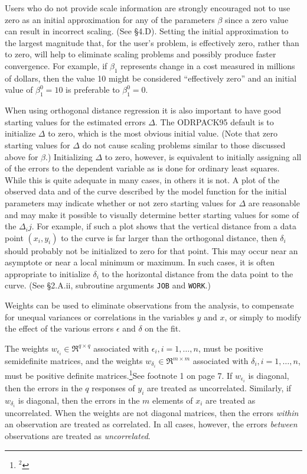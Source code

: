 \noindent Users who do not provide scale information are strongly encouraged not to use zero as an initial approximation for any of the parameters $\beta$ since a zero value can result in incorrect scaling. (See \S 4.D). Setting the initial approximation to the largest magnitude that, for the user's problem, is effectively zero, rather than to zero, will help to eliminate scaling problems and possibly produce faster convergence. For example, if $\beta_1$ represents change in a cost measured in millions of dollars, then the value 10 might be considered ``effectively zero'' and an initial value of $\beta_{1}^{0}=10$ is preferable to
$\beta_{1}^{0}=0$.

\noindent When using orthogonal distance regression it is also important to have
good starting values for the estimated errors $\Delta$. The ODRPACK95 default is to initialize $\Delta$ to zero, which is the most obvious initial value. (Note that zero starting values for $\Delta$ do not cause scaling problems similar to those discussed above for $\beta$.) Initializing $\Delta$ to zero, however, is equivalent to initially assigning all of the errors to the dependent variable as is done for ordinary least squares. While this is quite adequate in many cases, in others it is not. A plot of the observed data and of the curve described by the model function for the initial parameters may indicate whether or not zero starting values for $\Delta$ are reasonable and may make it possible to visually determine better starting values for some of the $\Delta_ij$. For example, if such a plot shows that the vertical distance from a data point $(x_{i},y_{i})$ to the curve is far larger than the orthogonal distance, then $\delta_i$ should probably not be initialized to zero for that point. This may occur near an asymptote or near a local minimum or maximum. In such cases, it is often appropriate to initialize $\delta_i$ to the horizontal distance from the data point to the curve. (See \S 2.A.ii, subroutine arguments {\tt JOB} and {\tt WORK}.)

\bigskip{}
\medskip
\noindent Weights can be used to eliminate observations from the analysis, to compensate for unequal variances or correlations in the variables $y$ and $x$, or simply to modify the effect of the various errors $\epsilon$ and $\delta$ on the fit.

\noindent The weights $w_{\epsilon_{i}}\in\Re^{q\times q}$ associated
with $\epsilon_{i},i=1,\ldots,n$, must be positive semidefinite
matrices, and the weights $w_{\delta_{i}}\in\Re^{m\times m}$
associated with $\delta_{i},i=1,\ldots,n$, must be positive definite
matrices.\footnote{$^2$}{\rmVIII See footnote 1 on page 7.} If
$w_{\epsilon_{i}}$ is diagonal, then the errors in the $q$ responses
of $y_i$ are treated as uncorrelated. Similarly, if $w_{\delta_{i}}$
is diagonal, then the errors in the $m$ elements of $x_i$ are treated
as uncorrelated. When the weights are not diagonal matrices, then the
errors {\it within} an observation are treated as correlated. In all
cases, however, the errors {\it between} observations are treated as
{\it uncorrelated}.

